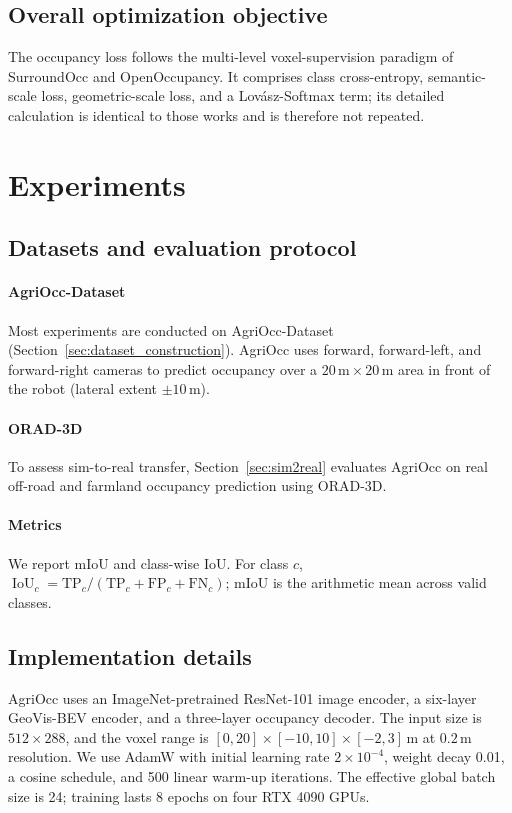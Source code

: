 \documentclass[a4paper,fleqn]{cas-sc}
\newcommand{\IoU}{\operatorname{IoU}}
\begin{document}
\subsection{Overall optimization objective}\label{sec:loss}
The occupancy loss follows the multi-level voxel-supervision paradigm of SurroundOcc and OpenOccupancy\citep{wei2023surroundocc,wang2023openoccupancy}. It comprises class cross-entropy, semantic-scale loss, geometric-scale loss, and a Lov\'{a}sz-Softmax term; its detailed calculation is identical to those works and is therefore not repeated.

\section{Experiments}\label{sec:experiments}
\subsection{Datasets and evaluation protocol}\label{sec:data}
\paragraph{AgriOcc-Dataset} Most experiments are conducted on AgriOcc-Dataset (Section~\ref{sec:dataset_construction}). AgriOcc uses forward, forward-left, and forward-right cameras to predict occupancy over a $20\,\mathrm{m}\times20\,\mathrm{m}$ area in front of the robot (lateral extent $\pm10\,$m).
\paragraph{ORAD-3D} To assess sim-to-real transfer, Section~\ref{sec:sim2real} evaluates AgriOcc on real off-road and farmland occupancy prediction using ORAD-3D\citep{chen2025orad3d}.
\paragraph{Metrics} We report mIoU and class-wise IoU. For class $c$, $\IoU_c=\mathrm{TP}_c/(\mathrm{TP}_c+\mathrm{FP}_c+\mathrm{FN}_c)$; mIoU is the arithmetic mean across valid classes.

\subsection{Implementation details}\label{sec:implementation}
AgriOcc uses an ImageNet-pretrained ResNet-101 image encoder, a six-layer GeoVis-BEV encoder, and a three-layer occupancy decoder. The input size is $512\times288$, and the voxel range is $[0,20]\times[-10,10]\times[-2,3]\,\mathrm{m}$ at $0.2\,\mathrm{m}$ resolution. We use AdamW with initial learning rate $2\times10^{-4}$, weight decay 0.01, a cosine schedule, and 500 linear warm-up iterations. The effective global batch size is 24; training lasts 8 epochs on four RTX 4090 GPUs.
\end{document}
